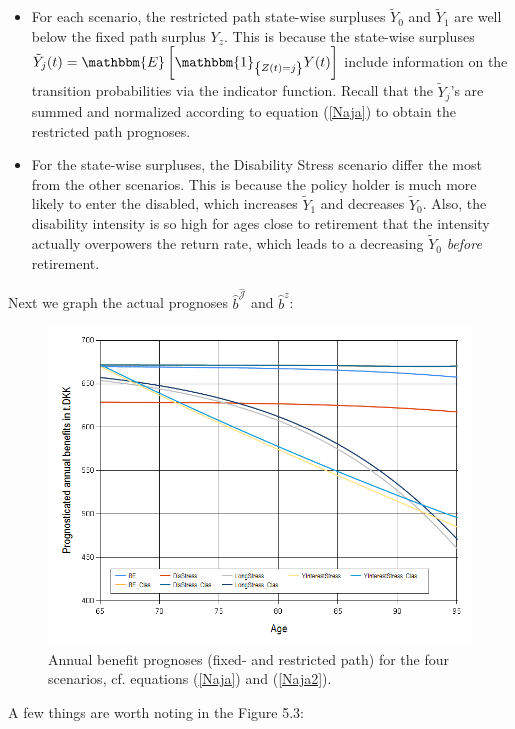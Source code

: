 \documentclass{article}
\newcommand{\1}[1]{\mathbbm{1}_{\left\lbrace #1 \right\rbrace}}
\newcommand{\expec}[1][def]{\mathbbm{E} \left[ #1 \right]}
\theoremstyle{break}
\theoremstyle{remark}
\numberwithin{equation}{section}
\begin{document}
\begin{itemize}
	\item For each scenario, the restricted path state-wise surpluses $\tilde{Y}_0$ and $\tilde{Y}_1$ are well below the fixed path surplus $Y_z$. This is because the state-wise surpluses $\tilde{Y}_j(t) = \expec[\1{Z(t)=j}Y(t)]$ include information on the transition probabilities via the indicator function. Recall that the $\tilde{Y}_j$'s are summed and normalized according to equation (\ref{Naja}) to obtain the restricted path prognoses.
	\item For the state-wise surpluses, the Disability Stress scenario differ the most from the other scenarios. This is because the policy holder is much more likely to enter the disabled, which increases $\tilde{Y}_1$ and decreases $\tilde{Y}_0$. Also, the disability intensity is so high for ages close to retirement that the intensity actually overpowers the return rate, which leads to a decreasing $\tilde{Y}_0$ \textit{before} retirement.
\end{itemize}

Next we graph the actual prognoses $\hat{b}^{\hat{\mathcal{J}}}$ and $\hat{b}^z$:

\begin{figure}[H] \label{FigureBens}
	\centering
	\caption{Annual benefit prognoses (fixed- and restricted path) for the four scenarios, cf. equations (\ref{Naja}) and (\ref{Naja2}).}
	\includegraphics[width=\textwidth]{Benefits}
\end{figure}

A few things are worth noting in the Figure 5.3:
\end{document}
